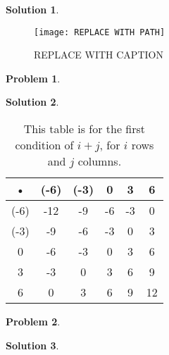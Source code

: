 \documentclass[10pt]{article}
\theoremstyle{plain}
\theoremstyle{definition}
\newtheorem{prob}{Problem}
\newtheorem*{sol}{Solution}
\theoremstyle{remark}
\begin{document}
\medskip

\begin{sol}

\end{sol}

\medskip

\begin{figure}[h]
\begin{center}
\texttt{[image:  REPLACE WITH PATH]} 
\end{center}
\caption{ REPLACE WITH CAPTION }
\end{figure}


\pagebreak

\begin{prob}

\end{prob}

\medskip

\begin{sol}

\end{sol}

\medskip

\begin{table}
\begin{center}
\begin{tabular}{|c|c|c|c|c|c|}
\hline 
• & (-6) & (-3) & 0 & 3 & 6 \\ 
\hline 
(-6) & -12 & -9 & -6 & -3 & 0 \\ 
\hline 
(-3) & -9 & -6 & -3 & 0 & 3 \\ 
\hline 
0 & -6 & -3 & 0 & 3 & 6 \\ 
\hline 
3 & -3 & 0 & 3 & 6 & 9 \\ 
\hline 
6 & 0 & 3 & 6 & 9 & 12 \\ 
\hline 
\end{tabular} 
\caption{This table is for the first condition of $i + j$, for $i$ rows and $j$ columns.}
\end{center}
\end{table}

\pagebreak

\begin{prob}

\end{prob}

\medskip

\begin{sol}

\end{sol}

\medskip

\begin{tikzpicture}

\end{tikzpicture}
\end{document}
